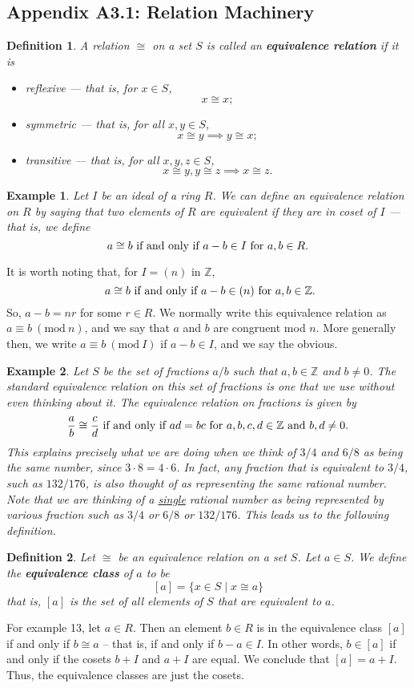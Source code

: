 \documentclass[12pt,reqno]{amsart}
\theoremstyle{plain}
\newtheorem{defi}{Definition}
\newtheorem{ex}{Example}
\newcommand{\zz}{\mathbb Z}
\newcommand{\Mod}[1]{\ (\mathrm{mod}\ #1)}
\begin{document}
\subsection{Appendix A3.1: Relation Machinery}
\begin{defi} A relation $\cong$ on a set $S$ is called an \textbf{equivalence relation} if it is
\begin{itemize}
\item[\textup{1}.] reflexive — that is, for $x \in S$,
\[
x \cong x;
\]
\item[$2$.] symmetric — that is, for all $x, y \in S$, 
\[
x \cong y \implies y \cong x;
\]
\item[$3$.] transitive — that is, for all $x, y, z\in S$, 
\[
x \cong y, y \cong z \implies x \cong z.
\]
\end{itemize}
\end{defi} 
\begin{ex} Let $I$ be an ideal of a ring $R$. We can define an equivalence relation on $R$ by saying that two elements of $R$ are equivalent if they are in coset of $I$ — that is, we define
\[
\textup{$a \cong b$ if and only if $a-b \in I$ for $a, b \in R$.}
\]
\end{ex} 
It is worth noting that, for $I = (n)$ in $\zz$,  
\[
\textup{ $a \cong b$ if and only if $a-b \in (n)$ for $a, b \in \zz$.}
\]
So, $a-b=nr$ for some $r \in R$. We normally write this equivalence relation as $a \equiv b \Mod{n}$, and we say that $a$ and $b$ are congruent mod $n$. More generally then, we write $a \equiv b \Mod{I}$ if $a-b \in I$, and we say the obvious. 

\begin{ex}
Let $S$ be the set of fractions $a/b$ such that $a, b \in \zz$ and $b \neq 0$. The standard equivalence relation on this set of fractions is one that we use without even thinking about it. The equivalence relation on fractions is given by
\[
\textup{$\frac{a}{b} \cong \frac{c}{d}$ if and only if $ad = bc$ for $a, b, c, d \in \zz$ and $b,d \neq 0$.}
\]
This explains precisely what we are doing when we think of $3/4$ and $6/8$ as being the same number, since $3 \cdot 8 = 4 \cdot 6$. In fact, any fraction that is equivalent to $3/4$, such as $132/176$, is also thought of as representing the same rational number. Note that we are thinking of a \underline{single} rational number as being represented by various fraction such as $3/4$ or $6/8$ or $132/176$. This leads us to the following definition. 
\end{ex} 
\begin{defi} Let $\cong$ be an equivalence relation on a set $S$. Let $a \in S$. We define the \textbf{equivalence class} of $a$ to be 
\[
[a] = \{ x \in S \mid x \cong a \}
\]
that is, $[a]$ is the set of all elements of $S$ that are equivalent to $a$. 
\end{defi} 
For example 13, let $a \in R$. Then an element $b \in R$ is in the equivalence class $[a]$ if and only if $b \cong a$ – that is, if and only if $b-a \in I$. In other words, $b \in [a]$ if and only if the cosets $b+I$ and $a+I$ are equal. We conclude that $[a] = a+I$. Thus, the equivalence classes are just the cosets. 
\end{document}
